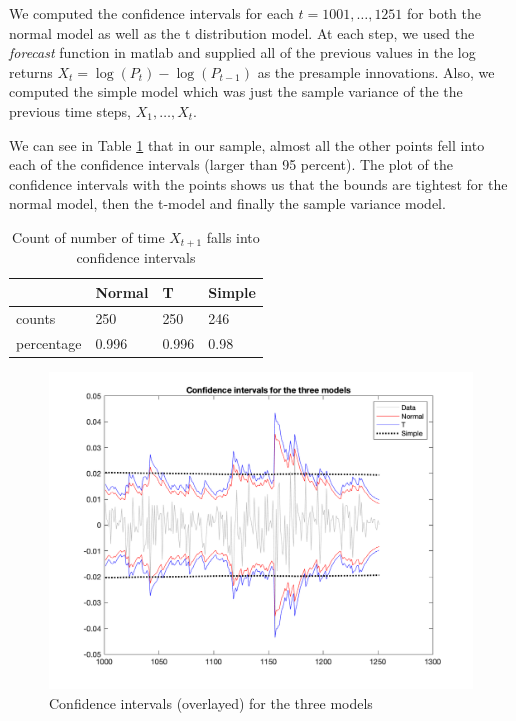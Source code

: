 \documentclass{article}
\begin{document}
We computed the confidence intervals for each $t = 1001,\ldots, 1251$ for both the normal model as well as the t distribution model.
At each step, we used the \textit{forecast} function in matlab and supplied all of the previous values in the log returns $X_t = \log(P_t) - \log(P_{t - 1})$ as the presample innovations.
Also, we computed the simple model which was just the sample variance of the the previous time steps, $X_1, \ldots, X_t$.

We can see in Table \ref{tab:ci_counts} that in our sample, almost all the other points fell into each of the confidence intervals (larger than 95 percent).
The plot of the confidence intervals with the points shows us that the bounds are tightest for the normal model, then the t-model and finally the sample variance model.

\begin{table}[H]
  \centering
\begin{tabular}{l | lll}
& Normal & T & Simple\\ \hline
counts & 250  & 250 & 246 \\
percentage & 0.996 & 0.996 & 0.98   \\
\end{tabular}

\caption{Count of number of time $X_{t+1}$ falls into confidence intervals}
\label{tab:ci_counts}
\end{table}

\begin{figure}[H]
\includegraphics[width=16cm]{plots/conf_ints_overlay.png}
\centering
\caption{Confidence intervals (overlayed) for the three models}
\label{fig:conf_intervals}
\end{figure}
\end{document}
